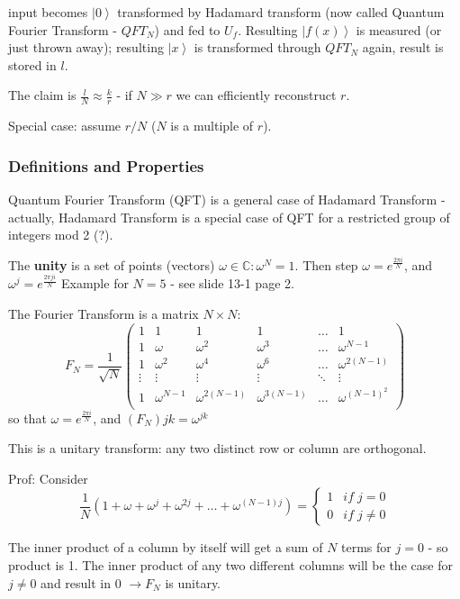 \documentclass{scrartcl}
\newcommand{\cplx}{\mathbb{C}} %
\newcommand{\ket}[1]{\left| #1 \right>} %
\begin{document}
input becomes $\ket0$ transformed by Hadamard transform (now called Quantum
Fourier Transform - $QFT_N$) and fed to $U_f$. Resulting $\ket{f(x)}$ is
measured (or just thrown away); resulting $\ket x$ is transformed through
$QFT_N$ again, result is stored in $l$.

The claim is $\frac{l}{N} \approx \frac{k}{r}$ - if $N \gg r$ we can efficiently
reconstruct $r$.

Special case: assume $r / N$ ($N$ is a multiple of $r$).

\subsubsection{Definitions and Properties}
\label{sec:DefinitionsAndProps}

Quantum Fourier Transform (QFT) is a general case of Hadamard Transform -
actually, Hadamard Transform is a special case of QFT for a restricted group of
integers mod 2 (?).

The {\bf unity} is a set of points (vectors) $\omega \in \cplx: \omega^N = 1$.
Then step $\omega = e^{\frac{2\pi i}N}$, and $\omega^j = e^{\frac{2\pi j i}N}$
Example for $N=5$ - see slide 13-1 page 2.

The Fourier Transform is a matrix $N \times N$:
$$F_N = \frac1{\sqrt N} \left(  
\begin{array}{cccccc}
  1 &  1&  1& 1& \dots & 1 \\
  1 &  \omega & \omega^2 & \omega^3 & \dots & \omega^{N-1} \\
  1 &  \omega^2 & \omega^4 & \omega^6 & \dots & \omega^{2(N-1)} \\
  \vdots & \vdots &  \vdots & \vdots & \ddots & \vdots \\
  1 &  \omega^{N-1} & \omega^{2(N-1)} & \omega^{3(N-1)} & \dots & \omega^{(N-1)^2} \\
\end{array}\right)$$
so that $\omega = e^{\frac{2\pi i}N}$, and $(F_N){jk} = \omega^{jk}$

This is a unitary transform: any two distinct row or column are orthogonal.

Prof: Consider $$ \frac1N(1 + \omega + \omega^j + \omega^{2j} + \dots +
\omega^{(N-1)j}) = \left\{
  \begin{array}{cl}
    1 & if \; j = 0 \\ 
    0 & if \; j \neq 0
  \end{array}
\right. $$

The inner product of a column by itself will get a sum of $N$ terms for $j=0$ -
so product is 1. The inner product of any two different columns will be the case
for $j \neq 0$ and result in 0 $\to F_N$ is unitary.
\end{document}
